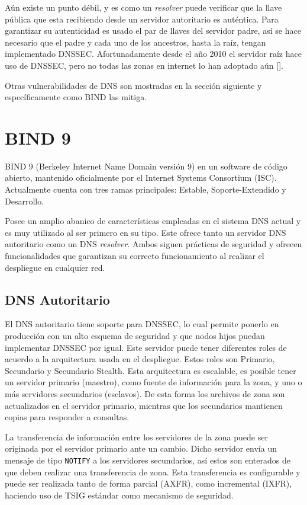 Aún existe un punto débil, y es como un \textit{resolver} puede verificar que la llave pública que esta recibiendo desde un servidor autoritario es auténtica. Para garantizar su autenticidad es usado el par de llaves del servidor padre, así se hace necesario que el padre y cada uno de los ancestros, hasta la raíz, tengan implementado DNSSEC. Afortunadamente desde el año 2010 el servidor raíz hace uso de DNSSEC, pero no todas las zonas en internet lo han adoptado aún [\cite{dnssec-icann}].

Otras vulnerabilidades de DNS son mostradas en la sección siguiente y específicamente como BIND las mitiga.  

\section{BIND 9}

BIND 9 (Berkeley Internet Name Domain versión 9) en un software de código abierto, mantenido oficialmente por el Internet Systems Consortium (ISC). Actualmente cuenta con tres ramas principales: Estable, Soporte-Extendido y Desarrollo.

Posee un amplio abanico de características empleadas en el sistema DNS actual y es muy utilizado al ser primero en su tipo. Este ofrece tanto un servidor DNS autoritario como un DNS \textit{resolver}. Ambos siguen prácticas de seguridad y ofrecen funcionalidades que garantizan su correcto funcionamiento al realizar el despliegue en cualquier red.

\subsection{DNS Autoritario}

El DNS autoritario tiene soporte para DNSSEC, lo cual permite ponerlo en producción con un alto esquema de seguridad y que nodos hijos puedan implementar DNSSEC por igual. Este servidor puede tener diferentes roles de acuerdo a la arquitectura usada en el despliegue. Estos roles son Primario, Secundario y Secundario Stealth. Esta arquitectura es escalable, es posible tener un servidor primario (maestro), como fuente de información para la zona, y uno o más servidores secundarios (esclavos). De esta forma los archivos de zona son actualizados en el servidor primario, mientras que los secundarios mantienen copias para responder a consultas.

La transferencia de información entre los servidores de la zona puede ser originada por el servidor primario ante un cambio. Dicho servidor envía un mensaje de tipo \verb+NOTIFY+ a los servidores secundarios, así estos son enterados de que deben realizar una transferencia de zona. Esta transferencia es configurable y puede ser realizada tanto de forma parcial (AXFR), como incremental (IXFR), haciendo uso de TSIG estándar como mecanismo de seguridad.

